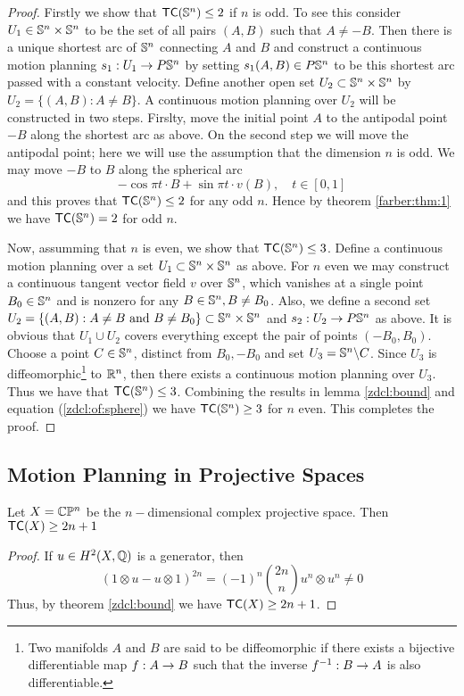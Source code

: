 \begin{proof}
    Firstly we show that $\textsf{TC}(\mathbb{S}^n) \le 2$ if $n$ is odd. To see this consider $U_1 \in \mathbb{S}^n \times \mathbb{S}^n$ to be the set of all pairs $(A,B)$ such that $A \neq -B$. Then there is a unique shortest arc of $\mathbb{S}^n$ connecting $A$ and $B$ and construct a continuous motion planning $s_1: U_1 \rightarrow P\mathbb{S}^n$ by setting $s_1(A,B) \in P\mathbb{S}^n$ to be this shortest arc passed with a constant velocity. Define another open set $U_2 \subset \mathbb{S}^n \times \mathbb{S}^n$ by $U_2 = \{(A,B) : A \neq B\}$. A continuous motion planning over $U_2$ will be constructed in two steps. Firslty, move the initial point $A$ to the antipodal point $-B$ along the shortest arc as above. On the second step we will move the antipodal point; here we will use the assumption that
    the dimension $n$ is odd. We may move $-B$ to $B$ along the spherical arc
    \[
        - \cos \pi t \cdot B + \sin \pi t \cdot v(B), \quad t \in [0,1]
    \]
    and this proves that $\textsf{TC}(\mathbb{S}^n) \le 2$ for any odd $n$. Hence by theorem \ref{farber:thm:1} we have $\textsf{TC}(\mathbb{S}^n) = 2$ for odd $n$.

    Now, assumming that $n$ is even, we show that $\textsf{TC}(\mathbb{S}^n) \le 3$. Define a continuous motion planning over a set $U_1 \subset \mathbb{S}^n \times \mathbb{S}^n$ as above. For $n$ even we may construct a continuous tangent vector field $v$ over $\mathbb{S}^n$, which vanishes at a single point $B_0 \in \mathbb{S}^n$ and is nonzero for any $B \in \mathbb{S}^n, B \neq B_0$. Also, we define a second set $U_2 = \{(A,B) : A \neq B \text{ and } B \neq B_0\} \subset \mathbb{S}^n \times \mathbb{S}^n$ and $s_2 : U_2 \rightarrow P\mathbb{S}^n$ as above. It is obvious that $U_1 \cup U_2$ covers everything except the pair of points $(-B_0, B_0)$. Choose a point $C \in \mathbb{S}^n$, distinct from $B_0, -B_0$ and set $U_3 = \mathbb{S}^n \backslash C$.
    Since $U_3$ is diffeomorphic\footnote{Two manifolds $A$ and $B$ are said to be diffeomorphic if there exists a bijective differentiable map $f: A \rightarrow B$ such that the inverse $f^{-1} : B \rightarrow A$ is also differentiable.} to $\mathbb{R}^n$, then there exists a continuous motion planning over $U_3$. Thus we have that $\textsf{TC}(\mathbb{S}^n) \le 3$. Combining the results in lemma \ref{zdcl:bound} and equation (\ref{zdcl:of:sphere}) we have $\textsf{TC}(\mathbb{S}^n) \ge 3$ for $n$ even. This completes the proof.
\end{proof}

\subsection{Motion Planning in Projective Spaces }
\begin{thm}
    Let $X = \mathbb{C}\mathbb{P}^n$ be the $n-$dimensional complex projective space. Then $\textsf{TC}(X) \ge 2n + 1$
\end{thm}

\begin{proof}
    If $u \in H^2(X, \mathbb{Q})$ is a generator, then
    \[
        (1 \otimes u - u \otimes 1)^{2n} = (-1)^n \binom{2n}{n} u^n \otimes u^n \neq 0
    \]
    Thus, by theorem \ref{zdcl:bound} we have $\textsf{TC}(X) \ge 2n + 1$.
\end{proof}



